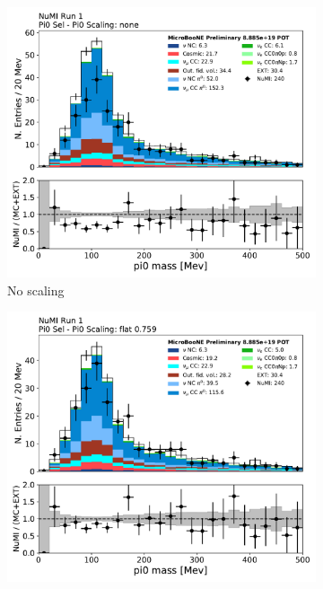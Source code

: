 \begin{figure}[H] 
\begin{center}
    \begin{subfigure}[b]{0.29\textwidth}
    \centering
    \includegraphics[width=1.00\textwidth]{Sidebands/Figures/NuMI/Pi0/pi0_mass_Y_NoScale.pdf}
    \caption{\label{fig:pi0NuMI:noscale} No scaling}
    \end{subfigure}
    \begin{subfigure}[b]{0.29\textwidth}
    \centering
    \includegraphics[width=1.00\textwidth]{Sidebands/Figures/NuMI/Pi0/pi0_mass_Y_FlatScale.pdf}

\end{subfigure}
\end{center}
\end{figure}
